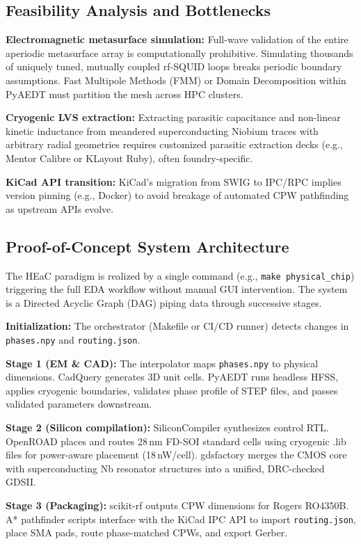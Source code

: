 \documentclass[11pt, a4paper]{article}
\begin{document}
\subsection{Feasibility Analysis and Bottlenecks}

\textbf{Electromagnetic metasurface simulation:} Full-wave validation of the entire aperiodic metasurface array is computationally prohibitive. Simulating thousands of uniquely tuned, mutually coupled rf-SQUID loops breaks periodic boundary assumptions. Fast Multipole Methods (FMM) or Domain Decomposition within PyAEDT must partition the mesh across HPC clusters.

\textbf{Cryogenic LVS extraction:} Extracting parasitic capacitance and non-linear kinetic inductance from meandered superconducting Niobium traces with arbitrary radial geometries requires customized parasitic extraction decks (e.g., Mentor Calibre or KLayout Ruby), often foundry-specific.

\textbf{KiCad API transition:} KiCad's migration from SWIG to IPC/RPC implies version pinning (e.g., Docker) to avoid breakage of automated CPW pathfinding as upstream APIs evolve.

\subsection{Proof-of-Concept System Architecture}

The HEaC paradigm is realized by a single command (e.g., \texttt{make physical\_chip}) triggering the full EDA workflow without manual GUI intervention. The system is a Directed Acyclic Graph (DAG) piping data through successive stages.

\textbf{Initialization:} The orchestrator (Makefile or CI/CD runner) detects changes in \texttt{phases.npy} and \texttt{routing.json}.

\textbf{Stage 1 (EM \& CAD):} The interpolator maps \texttt{phases.npy} to physical dimensions. CadQuery generates 3D unit cells. PyAEDT runs headless HFSS, applies cryogenic boundaries, validates phase profile of STEP files, and passes validated parameters downstream.

\textbf{Stage 2 (Silicon compilation):} SiliconCompiler synthesizes control RTL. OpenROAD places and routes 28\,nm FD-SOI standard cells using cryogenic .lib files for power-aware placement (18\,nW/cell). gdsfactory merges the CMOS core with superconducting Nb resonator structures into a unified, DRC-checked GDSII.

\textbf{Stage 3 (Packaging):} scikit-rf outputs CPW dimensions for Rogers RO4350B. A* pathfinder scripts interface with the KiCad IPC API to import \texttt{routing.json}, place SMA pads, route phase-matched CPWs, and export Gerber.
\end{document}
